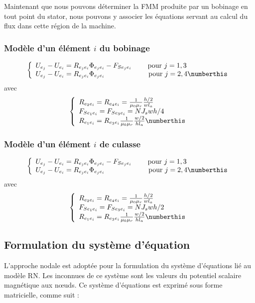 Maintenant que nous pouvons déterminer la FMM produite par un bobinage en tout point du stator, nous pouvons y associer les équations servant au calcul du flux dans cette région de la machine.

\subsubsection*{Modèle d'un élément $i$ du bobinage}
\[
\left\{
\begin{array}{l c l}
U_{e_j}-U_{e_i}=R_{e_je_i}\Phi_{e_je_i}-F_{Se_je_i} \qquad \text{ pour } j=1,3 \\
U_{e_j}-U_{e_i}=R_{e_je_i}\Phi_{e_je_i} \qquad \qquad\qquad  \text{ pour } j=2,4 \numberthis
\end{array}
\right.
\]
avec
\[
\left\{
\begin{array}{l c l}
R_{e_2e_i}=R_{e_4e_i}=\frac{1}{\mu_0\mu_r}\frac{h/2}{wl_a}\\
F_{Se_1e_i}=F_{Se_3e_i}=NJ_swh/4\\
R_{e_1e_i}=R_{e_3e_i}\frac{1}{\mu_0\mu_r}\frac{w/2}{hl_a} \numberthis
\end{array}
\right.
\]

\subsubsection*{Modèle d'un élément $i$ de culasse}
\[
\left\{
\begin{array}{l c l}
U_{e_j}-U_{e_i}=R_{e_je_i}\Phi_{e_je_i}-F_{Se_je_i} \qquad \text{ pour } j=1,3 \\
U_{e_j}-U_{e_i}=R_{e_je_i}\Phi_{e_je_i} \qquad \qquad\qquad  \text{ pour } j=2,4 \numberthis
\end{array}
\right.
\]
avec
\[
\left\{
\begin{array}{l c l}
R_{e_2e_i}=R_{e_4e_i}=\frac{1}{\mu_0\mu_r}\frac{h/2}{wl_a}\\
F_{Se_1e_i}=F_{Se_3e_i}=NJ_swh/2\\
R_{e_1e_i}=R_{e_3e_i}\frac{1}{\mu_0\mu_r}\frac{w/2}{hl_a} \numberthis
\end{array}
\right.
\]
\subsection{Formulation du système d'équation}
L’approche nodale est adoptée pour la formulation du système d’équations lié au modèle RN. Les
inconnues de ce système sont les valeurs du potentiel scalaire magnétique aux
nœuds. Ce système d’équations est exprimé sous forme matricielle, comme suit :

